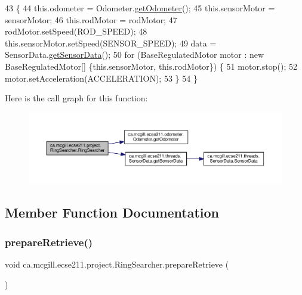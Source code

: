 \begin{DoxyCode}
43                                 \{
44     this.odometer = Odometer.\hyperlink{classca_1_1mcgill_1_1ecse211_1_1odometer_1_1_odometer_a99171f11e34dea918fa9dd069d721439}{getOdometer}();
45     this.sensorMotor = sensorMotor;
46     this.rodMotor = rodMotor;
47     rodMotor.setSpeed(ROD\_SPEED);
48     this.sensorMotor.setSpeed(SENSOR\_SPEED);
49     data = SensorData.\hyperlink{classca_1_1mcgill_1_1ecse211_1_1threads_1_1_sensor_data_a8260aba53b4474ca1275e4ce26157977}{getSensorData}();
50     \textcolor{keywordflow}{for} (BaseRegulatedMotor motor : \textcolor{keyword}{new} BaseRegulatedMotor[] \{this.sensorMotor, this.rodMotor\}) \{
51       motor.stop();
52       motor.setAcceleration(ACCELERATION);
53     \}
54   \}
\end{DoxyCode}
Here is the call graph for this function\+:\nopagebreak
\begin{figure}[H]
\begin{center}
\leavevmode
\includegraphics[width=350pt]{classca_1_1mcgill_1_1ecse211_1_1project_1_1_ring_searcher_a37eebb6cbdfd692e0979c3ca0fe2597b_cgraph}
\end{center}
\end{figure}


\subsection{Member Function Documentation}
\mbox{\label{classca_1_1mcgill_1_1ecse211_1_1project_1_1_ring_searcher_a3de30b85b1445157d7f8572992de7651}} 
\subsubsection{\texorpdfstring{prepare\+Retrieve()}{prepareRetrieve()}}
{\footnotesize\ttfamily void ca.\+mcgill.\+ecse211.\+project.\+Ring\+Searcher.\+prepare\+Retrieve (\begin{DoxyParamCaption}{ }\end{DoxyParamCaption})}


